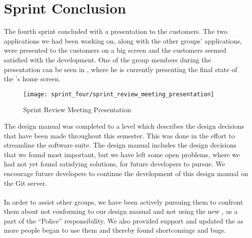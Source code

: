 
\chapter{Sprint Conclusion}
\label{cha:conclusion_sprint_4}

The fourth sprint concluded with a presentation to the customers. The two applications we had been working on, along with the other groups' applications, were presented to the customers on a big screen and the customers seemed satisfied with the development. One of the group members during the presentation can be seen in , where he is currently presenting the final state of the \launcher 's home screen.

\begin{figure}[!htbp]
    \centering
    \texttt{[image: sprint\_four/sprint\_review\_meeting\_presentation]}
    \caption{Sprint Review Meeting Presentation}
    \label{fig:sprint_review_meeting_presentation}
\end{figure}

\FloatBarrier

The design manual was completed to a level which describes the design decisions that have been made throughout this semester. This was done in the effort to streamline the \giraf software suite. The design manual includes the design decisions that we found most important, but we have left some open problems, where we had not yet found satisfying solutions, for future \giraf developers to pursue. We encourage future \giraf developers to continue the development of this design manual on the \giraf Git server.
\\\\
In order to assist other groups, we have been actively pursuing them to confront them about not conforming to our design manual and not using the new \gc, as a part of the ``\giraf Police'' responsibility. We also provided support and updated the \gc as more people began to use them and thereby found shortcomings and bugs. 